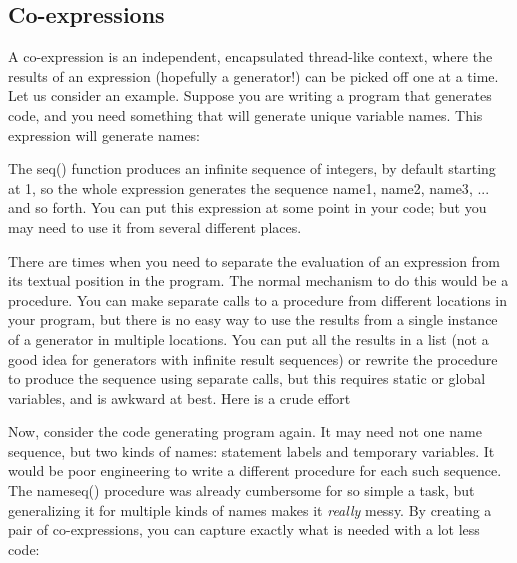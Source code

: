\subsection{Co-expressions}

A co-expression is an independent, encapsulated
thread{}-like context, where the results of an expression
(hopefully a generator!) can be picked off one at a time. Let us
consider an example. Suppose you are writing a program that generates
code, and you need something that will generate unique variable names.
This expression will generate names:


The \textsf{seq()} function produces an infinite sequence
of integers, by default starting at 1, so the whole expression
generates the sequence \textsf{{\textquotedbl}name1{\textquotedbl}},
\textsf{{\textquotedbl}name2{\textquotedbl}},
\textsf{{\textquotedbl}name3{\textquotedbl}}, ... and so forth. You can
put this expression at some point in your code; but you may need to use
it from several different places.

There are times when you need to separate the evaluation of an
expression from its textual position in the program. The normal
mechanism to do this would be a procedure. You can make separate calls
to a procedure from different locations in your program, but there is
no easy way to use the results from a single instance
of a generator in multiple locations. You can put all the results in a
list (not a good idea for generators with infinite result sequences) or
rewrite the procedure to produce the sequence using separate calls, but
this requires static or global variables, and is awkward at best. Here
is a crude effort


Now, consider the code generating program again. It may need not one
name sequence, but two kinds of names: statement labels and
temporary variables. It would be poor engineering to write a different
procedure for each such sequence. The \textsf{nameseq()}
procedure was already cumbersome for so simple a task, but generalizing
it for multiple kinds of names makes it \textit{really} messy. By
creating a pair of co-expressions, you can capture exactly what is
needed with a lot less code:

